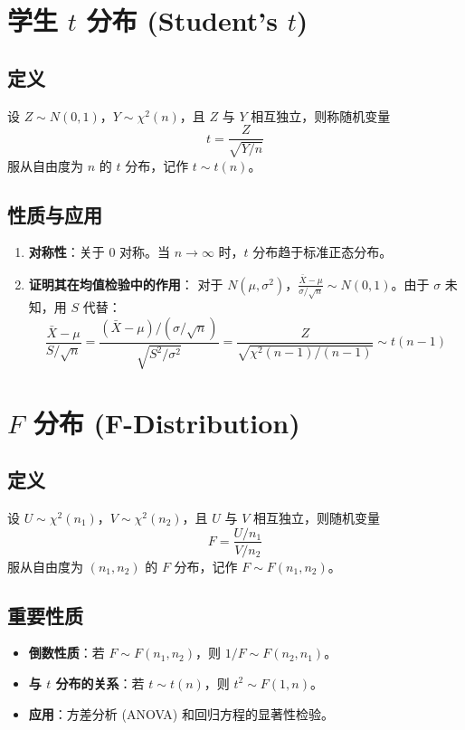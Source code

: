 \documentclass[12pt, a4paper]{article}
\begin{document}
\section{学生 $t$ 分布 (Student's $t$)}

\subsection{定义}
设 $Z \sim N(0, 1)$，$Y \sim \chi^2(n)$，且 $Z$ 与 $Y$ 相互独立，则称随机变量
$$ t = \frac{Z}{\sqrt{Y/n}} $$
服从自由度为 $n$ 的 $t$ 分布，记作 $t \sim t(n)$。

\subsection{性质与应用}
\begin{enumerate}
    \item \textbf{对称性}：关于 0 对称。当 $n \to \infty$ 时，$t$ 分布趋于标准正态分布。
    \item \textbf{证明其在均值检验中的作用}：
    对于 $N(\mu, \sigma^2)$，$\frac{\bar{X} - \mu}{\sigma/\sqrt{n}} \sim N(0, 1)$。由于 $\sigma$ 未知，用 $S$ 代替：
    $$ \frac{\bar{X} - \mu}{S/\sqrt{n}} = \frac{(\bar{X} - \mu)/(\sigma/\sqrt{n})}{\sqrt{S^2/\sigma^2}} = \frac{Z}{\sqrt{\chi^2(n-1)/(n-1)}} \sim t(n-1) $$
\end{enumerate}

\section{$F$ 分布 (F-Distribution)}

\subsection{定义}
设 $U \sim \chi^2(n_1)$，$V \sim \chi^2(n_2)$，且 $U$ 与 $V$ 相互独立，则随机变量
$$ F = \frac{U/n_1}{V/n_2} $$
服从自由度为 $(n_1, n_2)$ 的 $F$ 分布，记作 $F \sim F(n_1, n_2)$。

\subsection{重要性质}
\begin{itemize}
    \item \textbf{倒数性质}：若 $F \sim F(n_1, n_2)$，则 $1/F \sim F(n_2, n_1)$。
    \item \textbf{与 $t$ 分布的关系}：若 $t \sim t(n)$，则 $t^2 \sim F(1, n)$。
    \item \textbf{应用}：方差分析 (ANOVA) 和回归方程的显著性检验。
\end{itemize}
\end{document}
